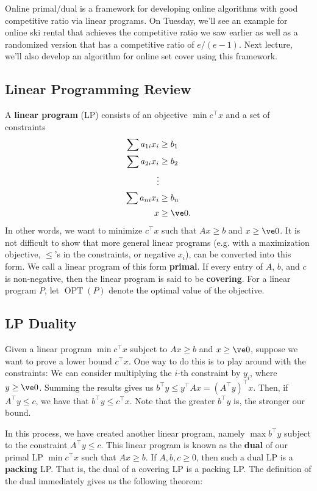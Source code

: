 \documentclass[11pt]{article}
\def\on{\operatorname}
\begin{document}
Online primal/dual is a framework for developing online algorithms with good competitive ratio via linear programs. On Tuesday, we'll see an example for online ski rental that achieves the competitive ratio we saw earlier as well as a randomized version that has a competitive ratio of $e/(e-1)$. Next lecture, we'll also develop an algorithm for online set cover using this framework.

\subsection{Linear Programming Review}

A \textbf{linear program} (LP) consists of an objective $\min c^\top x$ and a set of constraints
\begin{align*}
  \sum a_{1i} x_i&\ge b_1 \\
  \sum a_{2i} x_i&\ge b_2 \\
  \vdots \\
  \sum a_{ni} x_i&\ge b_n \\
  x &\ge \ve 0.
\end{align*}
In other words, we want to minimize $c^\top x$ such that $Ax\ge b$ and $x\ge \ve 0$. It is not difficult to show that more general linear programs (e.g. with a maximization objective, $\le$'s in the constraints, or negative $x_i$),  can be converted into this form. We call a linear program of this form \textbf{primal}. If every entry of $A$, $b$, and $c$ is non-negative, then the linear program is said to be \textbf{covering}. For a linear program $P$, let $\on{OPT}(P)$ denote the optimal value of the objective.

\subsection{LP Duality}

Given a linear program $\min c^\top x$ subject to $Ax\ge b$ and $x\ge\ve 0$, suppose we want to prove a lower bound $c^\top x$. One way to do this is to play around with the constraints: We can consider multiplying the $i$-th constraint by $y_i$, where $y\ge \ve 0$. Summing the results gives us $b^\top y\le y^\top Ax = (A^\top y)^\top x$. Then, if $A^\top y\le c$, we have that $b^\top y\le c^\top x$. Note that the greater $b^\top y$ is, the stronger our bound.

In this process, we have created another linear program, namely $\max b^\top y$ subject to the constraint $A^\top y\le c$. This linear program is known as the \textbf{dual} of our primal LP $\min c^\top x$ such that $Ax\ge b$. If $A,b,c\ge 0$, then such a dual LP is a \textbf{packing} LP. That is, the dual of a covering LP is a packing LP. The definition of the dual immediately gives us the following theorem:
\end{document}
